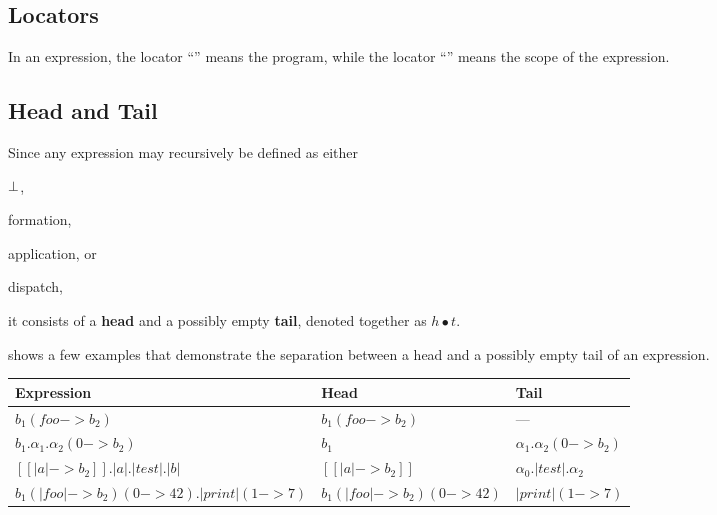 \subsection{Locators}\label{sec:locators}

In an expression, the locator ``\stx{\Phi}'' means the program,
while the locator ``\stx{\xi}'' means the scope of the expression.

\subsection{Head and Tail}

\begin{definition}
Since any expression may recursively be defined as either \begin{inparaenum}[1)]
    \item \(\bot\),
    \item formation,
    \item application,
    or
    \item dispatch,
\end{inparaenum}
it consists of a \textbf{head} and a possibly empty \textbf{tail}, denoted together as \(h\bullet{}t\).
\end{definition}

\begin{example}
 shows a few examples that demonstrate the separation
between a head and a possibly empty tail of an expression.

\begin{table*}
\label{tab:head-and-tail}
\begin{tabular}{lll}
\toprule
Expression & Head & Tail \\
\midrule
$b_1( foo -> b_2 )$
  & $b_1( foo -> b_2 )$
  & --- \\
$b_1.\alpha_1.\alpha_2( 0-> b_2 )$
  & $b_1$
  & $\alpha_1.\alpha_2( 0-> b_2 )$ \\
$[[ |a| -> b_2 ]].|a|.|test|.|b|$
  & $[[ |a| -> b_2 ]]$
  & $\alpha_0.|test|.\alpha_2$ \\
$b_1( |foo| -> b_2)( 0-> 42 ).|print|( 1-> 7 )$
  & $b_1( |foo| -> b_2)( 0-> 42 )$
  & $|print|( 1-> 7 )$ \\
\bottomrule
\end{tabular}
\end{table*}
\end{example}


